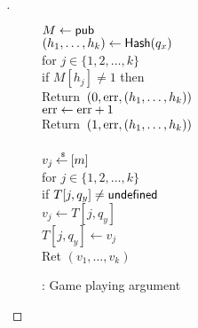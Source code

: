 \begin{proof}[]
\begin{figure}
{{$M \gets{\sf pub} $\\
$(h_1, \ldots, h_{k}) \gets \mathsf{Hash}(q_x)$\\
for $j \in \{1,2,\ldots,k\}$\\
\nudge if $M[h_j] \neq 1$ then \\
\nudge \nudge Return~$(0,\mathrm{err}, (h_1, \ldots, h_{k}) )$\\
$\mathrm{err} \gets \mathrm{err} +1$\\
Return~$(1,\mathrm{err}, (h_1, \ldots, h_{k}) )$\\
%
\\
$v_j {\:\stackrel{{\scriptscriptstyle \hspace{0.2em}\$}} {\leftarrow}\:} [m]$\\
for $j \in \{1,2,\ldots,k\}$\\
\nudge if $T[j,q_y] \neq \mathsf{undefined}$\\
\nudge \nudge $v_j \gets T[j,q_y]$\\
\nudge $T[j,q_y] \gets v_j$\\
Ret $\left(v_1,\ldots,v_k\right)$
}
}
\caption{: Game playing argument}\label{fig:3TGame}
\end{figure}
\begin{figure}
\end{figure}
\end{proof}
